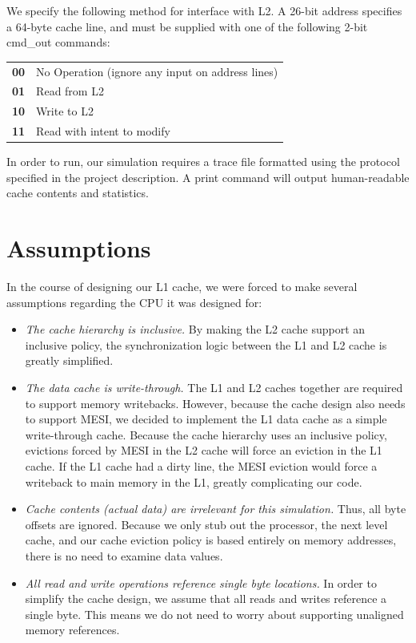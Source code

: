 \documentclass{article}
\begin{document}
We specify the following method for interface with L2.  A 26-bit
address specifies a 64-byte cache line, and must be supplied with one
of the following 2-bit cmd\_out commands:

\begin{center}
  \begin{tabular}{ll}
    \textbf{00} & No Operation (ignore any input on address lines) \\
    \textbf{01} &  Read from L2\\
    \textbf{10} & Write to L2 \\
    \textbf{11} & Read with intent to modify
  \end{tabular}
\end{center}

In order to run, our simulation requires a trace file formatted using
the protocol specified in the project description.  A print command
will output human-readable cache contents and statistics.

\section{Assumptions}

In the course of designing our L1 cache, we were forced to make
several assumptions regarding the CPU it was designed for:

\begin{itemize}

\item \emph{The cache hierarchy is inclusive.} By making the L2
  cache support an inclusive policy, the synchronization logic
  between the L1 and L2 cache is greatly simplified.

\item \emph{The data cache is write-through.} The L1 and L2 caches
  together are required to support memory writebacks. However, because
  the cache design also needs to support MESI, we decided to implement
  the L1 data cache as a simple write-through cache. Because the cache
  hierarchy uses an inclusive policy, evictions forced by MESI in the
  L2 cache will force an eviction in the L1 cache. If the L1 cache had
  a dirty line, the MESI eviction would force a writeback to main
  memory in the L1, greatly complicating our code.

\item \emph{Cache contents (actual data) are irrelevant for this
  simulation.} Thus, all byte offsets are ignored.  Because we only
  stub out the processor, the next level cache, and our cache eviction
  policy is based entirely on memory addresses, there is no need to
  examine data values.

\item \emph{All read and write operations reference single byte
  locations.} In order to simplify the cache design, we assume that
  all reads and writes reference a single byte. This means we do not
  need to worry about supporting unaligned memory references.

\end{itemize}
\end{document}
